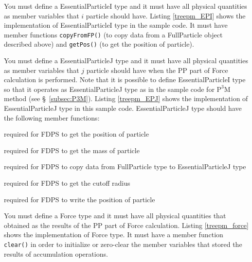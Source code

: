 You must define a \textsf{EssentialParticleI} type and it must have all physical quantities as member variables that $i$ particle should have. Listing \ref{treepm_EPI} shows the implementation of \textsf{EssentialParticleI} type in the sample code. It must have member functions \texttt{copyFromFP()} (to copy data from a \textsf{FullParticle} object described above) and \texttt{getPos()} (to get the position of particle).



You must define a \textsf{EssentialParticleJ} type and it must have all physical quantities as member variables that $j$ particle should have when the PP part of Force calculation is performed. Note that it is possible to define \textsf{EssentialParticleI} type so that it operates as \textsf{EssentialParticleJ} type as in the sample code for $\mathrm{P^{3}M}$ method (see \S~\ref{subsec:P3M}). Listing \ref{treepm_EPJ} shows the implementation of \textsf{EssentialParticleJ} type in this sample code. \textsf{EssentialParticleJ} type should have the following member functions:
\begin{description}[leftmargin=*,itemsep=-1ex,style=nextline]
\item[\texttt{getPos()}] required for FDPS to get the position of particle
\item[\texttt{getCharge()}] required for FDPS to get the mass of particle
\item[\texttt{copyFromFP()}] required for FDPS to copy data from \textsf{FullParticle} type to \textsf{EssentialParticleJ} type
\item[\texttt{getRSearch()}] required for FDPS to get the cutoff radius
\item[\texttt{setPos()}] required for FDPS to write the position of particle
\end{description}



You must define a \textsf{Force} type and it must have all physical quantities that obtained as the results of the PP part of Force calculation. Listing \ref{treepm_force} shows the implementation of \textsf{Force} type. It must have a member function \texttt{clear()} in order to initialize or zero-clear the member variables that stored the results of accumulation operations.

